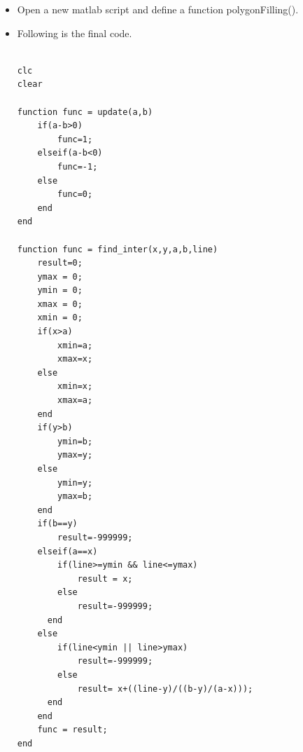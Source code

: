 \begin{itemize}

\item Open a new matlab script and define a function polygonFilling().
\item Following is the final code.
\begin{lstlisting}

clc
clear

function func = update(a,b)
	if(a-b>0)
		func=1;
	elseif(a-b<0)
		func=-1;
	else
		func=0;
	end
end

function func = find_inter(x,y,a,b,line)
	result=0;
	ymax = 0;
	ymin = 0;
	xmax = 0;
	xmin = 0;
	if(x>a)
		xmin=a;
		xmax=x;
	else
		xmin=x;
		xmax=a;
	end
	if(y>b)
		ymin=b;
		ymax=y;
	else
		ymin=y;
		ymax=b;
	end
	if(b==y)
		result=-999999;
	elseif(a==x)
		if(line>=ymin && line<=ymax)
	  		result = x;
		else
	  		result=-999999;
	  end
	else
		if(line<ymin || line>ymax)
	  		result=-999999;
		else
	  		result= x+((line-y)/((b-y)/(a-x)));
	  end
	end
	func = result;
end


\end{lstlisting}
\end{itemize}
